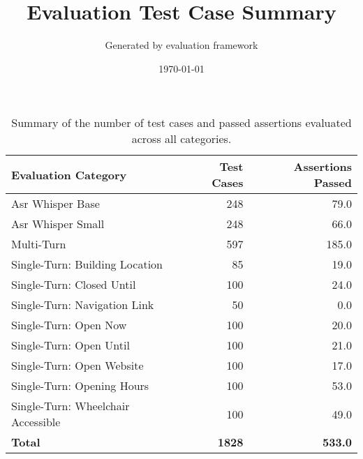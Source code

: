 \documentclass{article}
\title{Evaluation Test Case Summary}
\author{Generated by evaluation framework}
\date{\today}
\begin{document}
\maketitle
\begin{table}[h!]
\centering
\begin{tabular}{lrr}
\toprule
\textbf{Evaluation Category} & \textbf{Test Cases} & \textbf{Assertions Passed} \\
\midrule
Asr Whisper Base & 248 & 79.0 \\
Asr Whisper Small & 248 & 66.0 \\
Multi-Turn & 597 & 185.0 \\
Single-Turn: Building Location & 85 & 19.0 \\
Single-Turn: Closed Until & 100 & 24.0 \\
Single-Turn: Navigation Link & 50 & 0.0 \\
Single-Turn: Open Now & 100 & 20.0 \\
Single-Turn: Open Until & 100 & 21.0 \\
Single-Turn: Open Website & 100 & 17.0 \\
Single-Turn: Opening Hours & 100 & 53.0 \\
Single-Turn: Wheelchair Accessible & 100 & 49.0 \\

\midrule
\textbf{Total} & \textbf{1828} & \textbf{533.0} \\
\bottomrule
\end{tabular}
\caption{Summary of the number of test cases and passed assertions evaluated across all categories.}
\label{tab:evaluation_summary}
\end{table}
\end{document}
